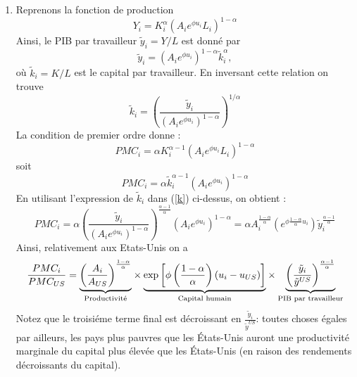\documentclass[a4paper,11pt]{article}
\begin{document}
\begin{enumerate}
\item Reprenons la fonction de production 
\begin{equation*}
Y_{i}=K_{i}^{\alpha }(A_{i}e^{\phi u_{i}}L_{i})^{1-\alpha }
\end{equation*}%
Ainsi, le PIB par travailleur $\tilde{y}_{i}=Y/L$ est donn\'{e} par%
\begin{equation*}
\tilde{y}_{i}=(A_{i}e^{\phi u_{i}})^{1-\alpha }\tilde{k}_{i}^{\alpha },
\end{equation*}%
o\`{u} $\tilde{k}_{i}=K/L$ est le capital par travailleur. En inversant
cette relation on trouve%
\begin{equation}
\tilde{k}_{i}=\left( \frac{\tilde{y}_{i}}{(A_{i}e^{\phi u_{i}})^{1-\alpha }}%
\right) ^{1/\alpha }  \label{k}
\end{equation}%
La condition de premier ordre donne :%
\begin{equation*}
PMC_{i}=\alpha K_{i}^{\alpha -1}(A_{i}e^{\phi u_{i}}L_{i})^{1-\alpha }
\end{equation*}%
soit%
\begin{equation*}
PMC_{i}=\alpha \tilde{k}_{i}^{\alpha -1}(A_{i}e^{\phi u_{i}})^{1-\alpha }
\end{equation*}%
En utilisant l'expression de $\tilde{k}_{i}$ dans (\ref{k}) ci-dessus, on
obtient :%
\begin{equation*}
PMC_{i}=\alpha \left( \frac{\tilde{y}_{i}}{(A_{i}e^{\phi u_{i}})^{1-\alpha }}%
\right) ^{\frac{\alpha -1}{\alpha }}(A_{i}e^{\phi u_{i}})^{1-\alpha }=\alpha
A_{i}^{\frac{1-\alpha }{\alpha }}(e^{\phi \frac{1-\alpha }{\alpha }u_{i}})%
\tilde{y}_{i}^{\frac{\alpha -1}{\alpha }}
\end{equation*}%
Ainsi, relativement aux Etats-Unis on a%
\begin{equation*}
\frac{PMC_{i}}{PMC_{US}}=\underset{\text{Productivit\'{e}}}{\underbrace{%
\left( \frac{A_{i}}{A_{US}}\right) ^{\frac{1-\alpha }{\alpha }}}}\times 
\underset{\text{Capital humain}}{\underbrace{\exp \left[ \phi \left( \frac{%
1-\alpha }{\alpha }\right) \left( u_{i}-u_{US}\right) \right] }}\times 
\underset{\text{PIB par travailleur}}{\underbrace{\left( \frac{\tilde{y}_{i}%
}{\tilde{y}^{US}}\right) ^{\frac{\alpha -1}{\alpha }}}}
\end{equation*}
Notez que le troisi\'{e}me terme final est décroissant en  $\frac{\tilde{y}_{i}%
}{\tilde{y}^{US}}$: toutes choses égales par ailleurs, les pays plus pauvres que les États-Unis auront une productivité marginale du capital plus élevée que les États-Unis (en raison des rendements décroissants du capital).


\end{enumerate}
\end{document}
